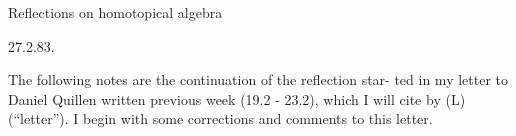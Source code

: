 
Reflections on homotopical algebra

27.2.83.

\margin{\unsure{\#}} The following notes are the continuation of the reflection star-%
ted in my letter to Daniel Quillen written previous week (19.2 - 23.2),
which I will cite by (L) (``letter''). I begin with some corrections and
comments to this letter.

